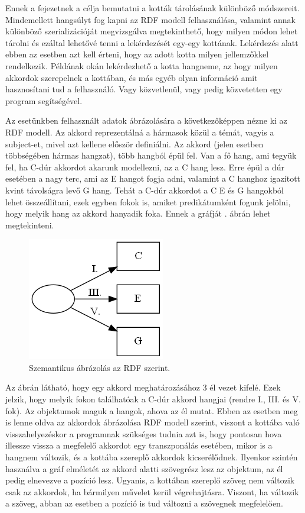 
Ennek a fejezetnek a célja bemutatni a kották tárolásának különböző módszereit. Mindemellett hangsúlyt fog kapni az RDF modell felhasználása, valamint annak különböző szerializációját megvizsgálva megtekinthető, hogy milyen módon lehet tárolni és ezáltal lehetővé tenni a lekérdezését egy-egy kottának. Lekérdezés alatt ebben az esetben azt kell érteni, hogy az adott kotta milyen jellemzőkkel rendelkezik. Példának okán lekérdezhető a kotta hangneme, az hogy milyen akkordok szerepelnek a kottában, és más egyéb olyan információ amit hasznosítani tud a felhasználó. Vagy közvetlenül, vagy pedig közvetetten egy program segítségével.


Az esetünkben felhasznált adatok ábrázolására a következőképpen nézne ki az RDF modell. Az akkord reprezentálná a hármasok közül a témát, vagyis a subject-et, mivel azt kellene először definiálni. Az akkord (jelen esetben többségében hármas hangzat), több hangból épül fel. Van a fő hang, ami tegyük fel, ha C-dúr akkordot akarunk modellezni, az a C hang lesz. Erre épül a dúr esetében a nagy terc, ami az E hangot fogja adni, valamint a C hanghoz igazított kvint távolságra levő G hang. Tehát a C-dúr akkordot a C E és G hangokból lehet összeállítani, ezek egyben fokok is, amiket predikátumként fogunk jelölni, hogy melyik hang az akkord hanyadik foka. Ennek a gráfját . ábrán lehet megtekinteni.

\begin{figure}[h]
	\centering
	\includegraphics[scale=1]{images/img_src/rdf_graph.png}
	\caption{Szemantikus ábrázolás az RDF szerint.}
	\label{fig:graph1}
\end{figure}

Az ábrán látható, hogy egy akkord meghatározásához 3 él vezet kifelé. Ezek jelzik, hogy melyik fokon találhatóak a C-dúr akkord hangjai (rendre I., III. és V. fok). Az objektumok maguk a hangok, ahova az él mutat. Ebben az esetben meg is lenne oldva az akkordok ábrázolása RDF modell szerint, viszont a kottába való visszahelyezéskor a programnak szükséges tudnia azt is, hogy pontosan hova illessze vissza a megfelelő akkordot egy transzponálás esetében, mikor is a hangnem változik, és a kottába szereplő akkordok kicserélődnek. 
Ilyenkor szintén használva a gráf elméletét az akkord alatti szövegrész lesz az objektum, az él pedig elnevezve a pozíció lesz. Ugyanis, a kottában szereplő szöveg nem változik csak az akkordok, ha bármilyen művelet kerül végrehajtásra. Viszont, ha változik a szöveg, abban az esetben a pozíció is tud változni a szövegnek megfelelően.

